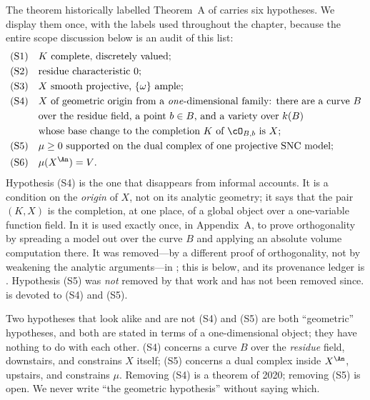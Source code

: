 The theorem historically labelled Theorem~A of \cite{BFJ15} carries six
hypotheses.  We display them once, with the labels used throughout the
chapter, because the entire scope discussion below is an audit of this list:
\begin{equation}
\label{eq:ch29-signature}
\begin{aligned}
 \textup{(S1)}\quad&\text{\(K\) complete, discretely valued;}\\
 \textup{(S2)}\quad&\text{residue characteristic \(0\);}\\
 \textup{(S3)}\quad&\text{\(X\) smooth projective, \(\{\omega\}\) ample;}\\
 \textup{(S4)}\quad&\text{\(X\) of geometric origin from a
   \emph{one}-dimensional family: there are a curve \(B\)}\\
 &\text{over the residue field, a point \(b\in B\), and a variety
   over \(k(B)\)}\\
 &\text{whose base change to the completion \(K\) of \(\cO_{B,b}\)
   is \(X\);}\\
 \textup{(S5)}\quad&\text{\(\mu\geq0\) supported on the dual complex of
   one projective SNC model;}\\
 \textup{(S6)}\quad&\text{\(\mu(X^{\An})=V\).}
\end{aligned}
\end{equation}
Hypothesis \textup{(S4)} is the one that disappears from informal accounts.
It is a condition on the \emph{origin} of \(X\), not on its analytic
geometry; it says that the pair \((K,X)\) is the completion, at one place,
of a global object over a one-variable function field.  In \cite{BFJ15} it
is used exactly once, in Appendix~A, to prove orthogonality by spreading a
model out over the curve \(B\) and applying an absolute volume computation
there.  It was removed---by a different proof of orthogonality, not by
weakening the analytic arguments---in \cite{BGGJKM20}; this is
 below, and its provenance ledger
is .  Hypothesis \textup{(S5)} was
\emph{not} removed by that work and has not been removed since.
 is devoted to \textup{(S4)} and \textup{(S5)}.

\begin{warning}{Two hypotheses that look alike and are not}
\textup{(S4)} and \textup{(S5)} are both ``geometric'' hypotheses, and both
are stated in terms of a one-dimensional object; they have nothing to do
with each other.  \textup{(S4)} concerns a curve \(B\) over the
\emph{residue} field, downstairs, and constrains \(X\) itself;
\textup{(S5)} concerns a dual complex inside \(X^{\An}\), upstairs, and
constrains \(\mu\).  Removing \textup{(S4)} is a theorem of 2020; removing
\textup{(S5)} is open.  We never write ``the geometric hypothesis'' without
saying which.
\end{warning}

